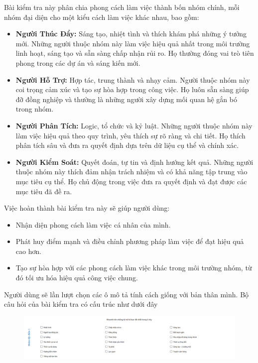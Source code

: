 Bài kiểm tra này phân chia phong cách làm việc thành bốn nhóm chính, mỗi nhóm đại diện cho một kiểu cách làm việc khác nhau, bao gồm:

\begin{itemize}
    \item \textbf{Người Thúc Đẩy:} Sáng tạo, nhiệt tình và thích khám phá những ý tưởng mới. Những người thuộc nhóm này làm việc hiệu quả nhất trong môi trường linh hoạt, sáng tạo và sẵn sàng chấp nhận rủi ro. Họ thường đóng vai trò tiên phong trong các dự án và sáng kiến mới.
    \item \textbf{Người Hỗ Trợ:} Hợp tác, trung thành và nhạy cảm. Người thuộc nhóm này coi trọng cảm xúc và tạo sự hòa hợp trong công việc. Họ luôn sẵn sàng giúp đỡ đồng nghiệp và thường là những người xây dựng mối quan hệ gắn bó trong nhóm.
    \item \textbf{Người Phân Tích:} Logic, tổ chức và kỷ luật. Những người thuộc nhóm này làm việc hiệu quả theo quy trình, yêu thích sự rõ ràng và chi tiết. Họ thích phân tích sâu và đưa ra quyết định dựa trên dữ liệu cụ thể và chính xác.
    \item \textbf{Người Kiểm Soát:} Quyết đoán, tự tin và định hướng kết quả. Những người thuộc nhóm này thích đảm nhận trách nhiệm và có khả năng tập trung vào mục tiêu cụ thể. Họ chủ động trong việc đưa ra quyết định và đạt được các mục tiêu đã đề ra.
\end{itemize}

Việc hoàn thành bài kiểm tra này sẽ giúp người dùng:

\begin{itemize}
    \item Nhận diện phong cách làm việc cá nhân của mình.
    \item Phát huy điểm mạnh và điều chỉnh phương pháp làm việc để đạt hiệu quả cao hơn.
    \item Tạo sự hòa hợp với các phong cách làm việc khác trong môi trường nhóm, từ đó tối ưu hóa hiệu quả công việc chung.
\end{itemize}

Người dùng sẽ lần lượt chọn các ô mô tả tính cách giống với bản thân mình. Bộ câu hỏi của bài kiểm tra có cấu trúc như dưới đây

\begin{figure}[H]
    \centering
    \includegraphics[width=1.2\linewidth]{images/ws1.png}
\end{figure}

